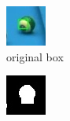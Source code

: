 \begin{figure}[h]
    \centering
    \begin{subfigure}[b]{0.25\textwidth}
        \centering
        \includegraphics[width=\textwidth]{imgs/ball_localization/bbox_before.jpg}
        \caption{original box}
    \end{subfigure}
    \hspace{0.05\textwidth}
    \begin{subfigure}[b]{0.25\textwidth}
        \centering
        \includegraphics[width=\textwidth]{imgs/ball_localization/grabcut.jpg}

\end{subfigure}
\end{figure}
